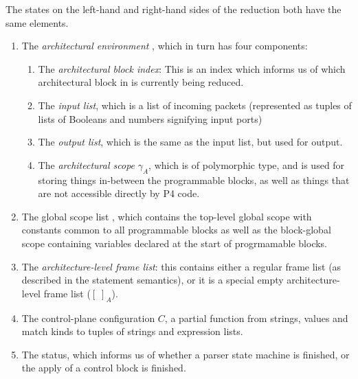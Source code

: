 \documentclass[UTF8]{article}
\begin{document}
The states on the left-hand and right-hand sides of the reduction both have the same elements.
\begin{enumerate}
\item The \emph{architectural environment} \aenv{}, which in turn has four components:
\begin{enumerate}
\item The \emph{architectural block index}: This is an index which informs us of which architectural block in \abl{} is currently being reduced.
\item The \emph{input list}, which is a list of incoming packets (represented as tuples of lists of Booleans and numbers signifying input ports)
\item The \emph{output list}, which is the same as the input list, but used for output.
\item The \emph{architectural scope} $\gamma_A$, which is of polymorphic type, and is used for storing things in-between the programmable blocks, as well as things that are not accessible directly by P4 code.
\end{enumerate}
\item The global scope list \gscopel{}, which contains the top-level global scope with constants common to all programmable blocks as well as the block-global scope containing variables declared at the start of progrmamable blocks.
\item The \emph{architecture-level frame list}: this contains either a regular frame list (as described in the statement semantics), or it is a special empty architecture-level frame list ($[ \; ]_A$).
\item The control-plane configuration $C$, a partial function from strings, values and match kinds to tuples of strings and expression lists.
\item The status, which informs us of whether a parser state machine is finished, or the apply of a control block is finished.
\end{enumerate}
\end{document}
